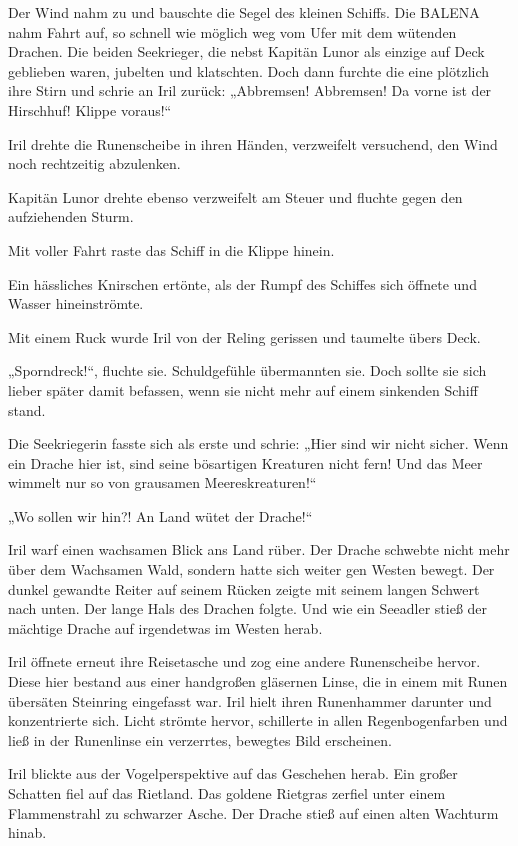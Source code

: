 Der Wind nahm zu und bauschte die Segel des kleinen Schiffs. Die BALENA nahm Fahrt auf, so schnell wie möglich weg vom Ufer mit dem wütenden Drachen. Die beiden Seekrieger, die nebst Kapitän Lunor als einzige auf Deck geblieben waren, jubelten und klatschten. Doch dann furchte die eine plötzlich ihre Stirn und schrie an Iril zurück: „Abbremsen! Abbremsen! Da vorne ist der Hirschhuf! Klippe voraus!“

Iril drehte die Runenscheibe in ihren Händen, verzweifelt versuchend, den Wind noch rechtzeitig abzulenken.

Kapitän Lunor drehte ebenso verzweifelt am Steuer und fluchte gegen den aufziehenden Sturm.

Mit voller Fahrt raste das Schiff in die Klippe hinein.

Ein hässliches Knirschen ertönte, als der Rumpf des Schiffes sich öffnete und Wasser hineinströmte.

Mit einem Ruck wurde Iril von der Reling gerissen und taumelte übers Deck.

„Sporndreck!“, fluchte sie. Schuldgefühle übermannten sie. Doch sollte sie sich lieber später damit befassen, wenn sie nicht mehr auf einem sinkenden Schiff stand.

Die Seekriegerin fasste sich als erste und schrie: „Hier sind wir nicht sicher. Wenn ein Drache hier ist, sind seine bösartigen Kreaturen nicht fern! Und das Meer wimmelt nur so von grausamen Meereskreaturen!“

„Wo sollen wir hin?! An Land wütet der Drache!“

Iril warf einen wachsamen Blick ans Land rüber. Der Drache schwebte nicht mehr über dem Wachsamen Wald, sondern hatte sich weiter gen Westen bewegt. Der dunkel gewandte Reiter auf seinem Rücken zeigte mit seinem langen Schwert nach unten. Der lange Hals des Drachen folgte. Und wie ein Seeadler stieß der mächtige Drache auf irgendetwas im Westen herab.

Iril öffnete erneut ihre Reisetasche und zog eine andere Runenscheibe hervor. Diese hier bestand aus einer handgroßen gläsernen Linse, die in einem mit Runen übersäten Steinring eingefasst war. Iril hielt ihren Runenhammer darunter und konzentrierte sich. Licht strömte hervor, schillerte in allen Regenbogenfarben und ließ in der Runenlinse ein verzerrtes, bewegtes Bild erscheinen.

Iril blickte aus der Vogelperspektive auf das Geschehen herab. Ein großer Schatten fiel auf das Rietland. Das goldene Rietgras zerfiel unter einem Flammenstrahl zu schwarzer Asche. Der Drache stieß auf einen alten Wachturm hinab.

